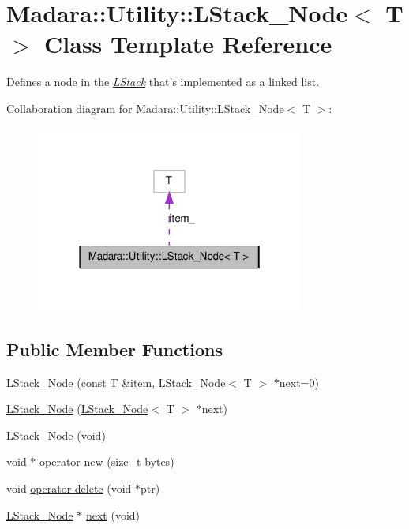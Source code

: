 \hypertarget{classMadara_1_1Utility_1_1LStack__Node}{
\section{Madara::Utility::LStack\_\-Node$<$ T $>$ Class Template Reference}
\label{d6/dc5/classMadara_1_1Utility_1_1LStack__Node}
}


Defines a node in the {\itshape \hyperlink{classMadara_1_1Utility_1_1LStack}{LStack}\/} that's implemented as a linked list.  




Collaboration diagram for Madara::Utility::LStack\_\-Node$<$ T $>$:
\nopagebreak
\begin{figure}[H]
\begin{center}
\leavevmode
\includegraphics[width=250pt]{d0/d92/classMadara_1_1Utility_1_1LStack__Node__coll__graph}
\end{center}
\end{figure}
\subsection*{Public Member Functions}
\begin{DoxyCompactItemize}
\item 
\hyperlink{classMadara_1_1Utility_1_1LStack__Node_af17db22dd3418534b2d45f92bcc93fda}{LStack\_\-Node} (const T \&item, \hyperlink{classMadara_1_1Utility_1_1LStack__Node}{LStack\_\-Node}$<$ T $>$ $\ast$next=0)
\item 
\hyperlink{classMadara_1_1Utility_1_1LStack__Node_a0b695990ed5531a3d800ed2fb4ca2228}{LStack\_\-Node} (\hyperlink{classMadara_1_1Utility_1_1LStack__Node}{LStack\_\-Node}$<$ T $>$ $\ast$next)
\item 
\hyperlink{classMadara_1_1Utility_1_1LStack__Node_ac2d3e8e18df936d68ccb1500568d93dd}{LStack\_\-Node} (void)
\item 
void $\ast$ \hyperlink{classMadara_1_1Utility_1_1LStack__Node_af7ef615f59c649211d46945b8214acdd}{operator new} (size\_\-t bytes)
\item 
void \hyperlink{classMadara_1_1Utility_1_1LStack__Node_ab9cc21b0a4f7dfc4aa120364525471ec}{operator delete} (void $\ast$ptr)
\item 
\hyperlink{classMadara_1_1Utility_1_1LStack__Node}{LStack\_\-Node} $\ast$ \hyperlink{classMadara_1_1Utility_1_1LStack__Node_aa44100070c9c8dce211098ef40702f58}{next} (void)
\end{DoxyCompactItemize}
